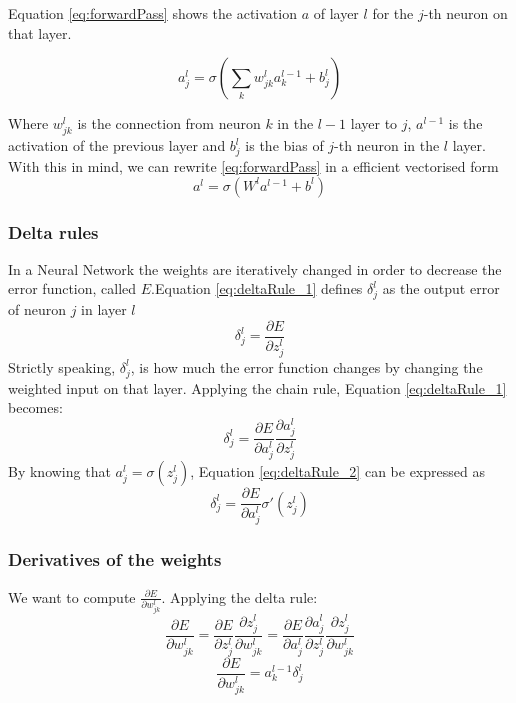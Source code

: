 \documentclass[11pt]{article}
\begin{document}
Equation \ref{eq:forwardPass} shows the activation $a$ of layer $l$ for the $j$-th neuron on that layer.

\begin{equation}
\label{eq:forwardPass}
a^l_j = \sigma(\sum_k w^l_{jk}a^{l-1}_k + b^l_j)
\end{equation}

Where $w^l_{jk}$ is the connection from neuron $k$ in the $l-1$ layer to $j$, $a^{l-1}$ is the activation of the previous layer and $b^l_j$ is the bias of $j$-th neuron in the $l$ layer. With this in mind, we can rewrite \ref{eq:forwardPass} in a efficient vectorised form
\begin{equation}
\label{eq:forwardPassVectorized}
a^l = \sigma(W^la^{l-1} + b^l)
\end{equation}

\subsubsection{Delta rules}
In a Neural Network the weights are iteratively changed in order to decrease the error function, called $E$.Equation \ref{eq:deltaRule_1} defines $\delta^l_j$ as the output error of neuron $j$ in layer $l$
\begin{equation}
	\label{eq: deltaRule_1}
	\delta^l_j = \frac{\partial E}{\partial z^l_j}
\end{equation}
Strictly speaking, $\delta^l_j$, is how much the error function changes by changing the weighted input on that layer. Applying the chain rule, Equation \ref{eq:deltaRule_1} becomes:
\begin{equation}
\label{eq:deltaRule_2}
\delta^l_j = \frac{\partial E}{\partial a^l_j} \frac{\partial a^l_j}{\partial z^l_j}
\end{equation}
By knowing that $a^l_j = \sigma(z^l_j)$, Equation \ref{eq:deltaRule_2} can be expressed as
\begin{equation}
\label{eq:deltaRule}	
\delta^l_j = \frac{\partial E}{\partial a^l_j} \sigma'(z^l_j)
\end{equation}  

\subsubsection{Derivatives of the weights}
We want to compute $\frac{\partial E}{\partial w^l_{jk}}$. Applying the delta rule:
\begin{equation}
\frac{\partial E}{\partial w^l_{jk}} = \frac{\partial E}{\partial z^l_j}\frac{\partial z^l_j}{\partial w^l_{jk}} =	
\frac{\partial E}{\partial a^l_j}\frac{\partial a^l_j}{\partial z^l_{j}}
\frac{\partial z^l_j}{\partial w^l_{jk}}
\end{equation}
\begin{equation}
\label{eq:derivativesWeigthDeltas}	
\frac{\partial E}{\partial w^l_{jk}} = a^{l-1}_k \delta^l_j
\end{equation}
\end{document}
